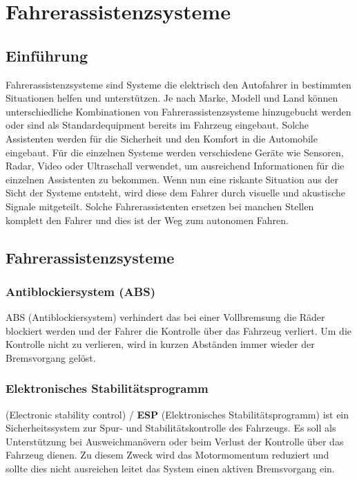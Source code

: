 \section{Fahrerassistenzsysteme}
    \subsection{Einführung}
    Fahrerassistenzsysteme sind Systeme die elektrisch den Autofahrer in bestimmten
    Situationen helfen und unterstützen. Je nach Marke, Modell und Land können
    unterschiedliche Kombinationen von Fahrerassistenzsysteme hinzugebucht werden
    oder sind als Standardequipment bereits im Fahrzeug eingebaut. Solche Assistenten
    werden für die Sicherheit und den Komfort in die Automobile eingebaut. Für die
    einzelnen Systeme werden verschiedene Geräte wie Sensoren, Radar, Video oder
    Ultraschall verwendet, um ausreichend Informationen für die einzelnen Assistenten
    zu bekommen. Wenn nun eine riskante Situation aus der Sicht der Systeme entsteht,
    wird diese dem Fahrer durch visuelle und akustische Signale mitgeteilt. Solche
    Fahrerassistenten ersetzen bei manchen Stellen komplett den Fahrer und dies ist
    der Weg zum autonomen Fahren.
    ~\cite{assistenzsysteme.PB1} ~\cite{assistenzsysteme.PB2} ~\cite{assistenzsysteme.PB3}
    ~\cite{assistenzsysteme.PB4}
    \subsection{Fahrerassistenzsysteme}

        \subsubsection{Antiblockiersystem (ABS)}
        ABS (Antiblockiersystem) verhindert das bei einer Vollbremsung die Räder
        blockiert werden und der Fahrer die Kontrolle über das Fahrzeug verliert.
        Um die Kontrolle nicht zu verlieren, wird in kurzen Abständen immer wieder
        der Bremsvorgang gelöst.
        ~\cite{assistenzsysteme.PB2} ~\cite{antiblockiersys.PB1}

        \subsubsection{Elektronisches Stabilitätsprogramm}
        (Electronic stability control) / \textbf{ESP} (Elektronisches Stabilitätsprogramm)
        ist ein Sicherheitssystem zur Spur- und Stabilitätskontrolle des Fahrzeugs.
        Es soll als Unterstützung bei Ausweichmanövern oder beim Verlust der Kontrolle über das Fahrzeug dienen. 
        Zu diesem Zweck wird das Motormomentum reduziert und sollte dies nicht ausreichen leitet das System einen aktiven
        Bremsvorgang ein.
        ~\cite{assistenzsysteme.PB2} ~\cite{ESP.PB1}
        
